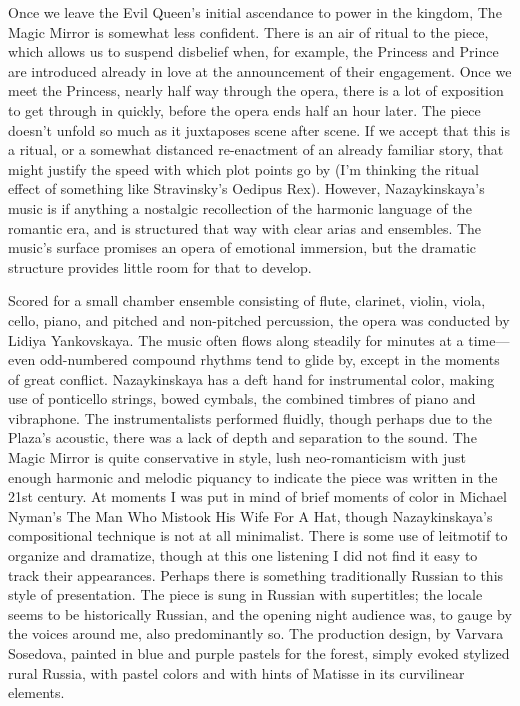 Once we leave the Evil Queen’s initial ascendance to power in the kingdom, The Magic Mirror is somewhat less confident. There is an air of ritual to the piece, which allows us to suspend disbelief when, for example, the Princess and Prince are introduced already in love at the announcement of their engagement. Once we meet the Princess, nearly half way through the opera, there is a lot of exposition to get through in quickly, before the opera ends half an hour later. The piece doesn’t unfold so much as it juxtaposes scene after scene. If we accept that this is a ritual, or a somewhat distanced re-enactment of an already familiar story, that might justify the speed with which plot points go by (I’m thinking the ritual effect of something like Stravinsky’s Oedipus Rex). However, Nazaykinskaya’s music is if anything a nostalgic recollection of the harmonic language of the romantic era, and is structured that way with clear arias and ensembles. The music’s surface promises an opera of emotional immersion, but the dramatic structure provides little room for that to develop.

Scored for a small chamber ensemble consisting of flute, clarinet, violin, viola, cello, piano, and pitched and non-pitched percussion, the opera was conducted by Lidiya Yankovskaya. The music often flows along steadily for minutes at a time—even odd-numbered compound rhythms tend to glide by, except in the moments of great conflict. Nazaykinskaya has a deft hand for instrumental color, making use of ponticello strings, bowed cymbals, the combined timbres of piano and vibraphone. The instrumentalists performed fluidly, though perhaps due to the Plaza’s acoustic, there was a lack of depth and separation to the sound. The Magic Mirror is quite conservative in style, lush neo-romanticism with just enough harmonic and melodic piquancy to indicate the piece was written in the 21st century. At moments I was put in mind of brief moments of color in Michael Nyman’s The Man Who Mistook His Wife For A Hat, though Nazaykinskaya’s compositional technique is not at all minimalist. There is some use of leitmotif to organize and dramatize, though at this one listening I did not find it easy to track their appearances. Perhaps there is something traditionally Russian to this style of presentation. The piece is sung in Russian with supertitles; the locale seems to be historically Russian, and the opening night audience was, to gauge by the voices around me, also predominantly so. The production design, by Varvara Sosedova, painted in blue and purple pastels for the forest, simply evoked stylized rural Russia, with pastel colors and with hints of Matisse in its curvilinear elements.

